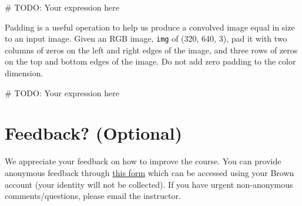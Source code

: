 \documentclass{csci1430}
\begin{document}
\begin{answer}
\begin{python}
# TODO: Your expression here
\end{python}
\end{answer}
    
\begin{subquestion}[points=1]
Padding is a useful operation to help us produce a convolved image equal in size to an input image. Given an RGB image, \texttt{img} of (320, 640, 3), pad it with two columns of zeros on the left and right edges of the image, and three rows of zeros on the top and bottom edges of the image. Do not add zero padding to the color dimension.
\end{subquestion}
    
\begin{answer}
\begin{python}
# TODO: Your expression here
\end{python}
\end{answer}

\pagebreak

\section*{Feedback? (Optional)}
We appreciate your feedback on how to improve the course. You can provide anonymous feedback through \href{https://forms.gle/Eu5jJbDUmLknAyJV9}{this form} which can be accessed using your Brown account (your identity will not be collected). If you have urgent non-anonymous comments/questions, please email the instructor. 
\end{document}
